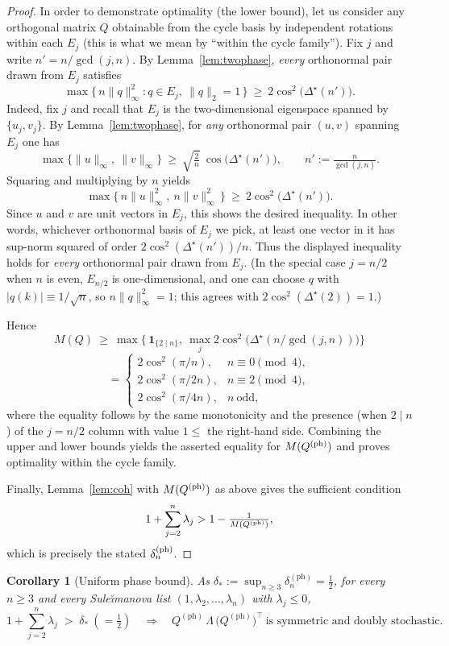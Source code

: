 \documentclass[12pt,fleqn]{amsart}
\renewcommand{\le}{\leqslant}
\renewcommand{\ge}{\geqslant}
\newtheorem{cor}[thm]{Corollary}
\theoremstyle{remark}
\newcommand{\1}{\mathbf{1}}
\begin{document}
\begin{proof}
In order to demonstrate optimality (the lower bound), let us consider any orthogonal matrix $Q$ obtainable from the cycle basis by independent rotations within each $E_j$ (this is what we mean by “within the cycle family”). Fix $j$ and write $n'=n/\gcd(j,n)$. By Lemma~\ref{lem:twophase}, \emph{every} orthonormal pair drawn from $E_j$ satisfies
\[
\max\{\,n\|q\|_\infty^2 : q\in E_j,\ \|q\|_2=1\,\}\ \ge\ 2\cos^2\!\big(\Delta^\star(n')\big).
\]
Indeed, fix $j$ and recall that $E_j$ is the two-dimensional eigenspace
spanned by $\{u_j,v_j\}$. By Lemma~\ref{lem:twophase}, for \emph{any}
orthonormal pair $(u,v)$ spanning $E_j$ one has
\[
\max\{\|u\|_\infty,\ \|v\|_\infty\}\ \ge\ 
\sqrt{\tfrac{2}{n}}\ \cos\!\bigl(\Delta^\star(n')\bigr),
\qquad n':=\tfrac{n}{\gcd(j,n)}.
\]
Squaring and multiplying by $n$ yields
\[
\max\{\,n\|u\|_\infty^2,\ n\|v\|_\infty^2\,\}\ \ge\
2\cos^2\!\bigl(\Delta^\star(n')\bigr).
\]
Since $u$ and $v$ are unit vectors in $E_j$, this shows the desired inequality. 
In other words, whichever orthonormal basis of $E_j$ we pick, at least
one vector in it has sup-norm squared of order $2\cos^2(\Delta^\star(n'))/n$.
Thus the displayed inequality holds for \emph{every} orthonormal pair
drawn from $E_j$. (In the special case $j=n/2$ when $n$ is even, $E_{n/2}$
is one-dimensional, and one can choose $q$ with $|q(k)|\equiv 1/\sqrt{n}$,
so $n\|q\|_\infty^2=1$; this agrees with
$2\cos^2(\Delta^\star(2))=1$.)

Hence
\[
M(Q)\ \ge\ \max\Big\{\,\mathbf{1}_{\{2\mid n\}},\ \max_{j}2\cos^2\!\big(\Delta^\star(n/\gcd(j,n))\big)\Big\}
\]
\[
=\begin{cases}
2\cos^2(\pi/n), & n\equiv 0\pmod 4,\\
2\cos^2(\pi/2n), & n\equiv 2\pmod 4,\\
2\cos^2(\pi/4n), & n\ \text{odd},
\end{cases}
\]
where the equality follows by the same monotonicity and the presence (when $2\mid n$) of the $j=n/2$ column with value $1\le$ the right-hand side. Combining the upper and lower bounds yields the asserted equality for $M(Q^{\rm (ph)})$ and proves optimality within the cycle family.

Finally, Lemma~\ref{lem:coh} with $M(Q^{\rm (ph)})$ as above gives the sufficient condition
\[
1+\sum_{j=2}^n\lambda_j>1-\tfrac{1}{M(Q^{\rm (ph)})},
\]
which is precisely the stated $\delta^{\rm (ph)}_n$.
\end{proof}

\begin{cor}[Uniform phase bound]\label{cor:uniform}
As $\delta_\ast:=\sup_{n\ge3}\delta^{\mathrm{(ph)}}_n=\tfrac12$, for every $n\ge3$ and every Sule\u{\i}manova list $(1,\lambda_2,\ldots,\lambda_n)$ with $\lambda_j\le0$,
\[
1+\sum_{j=2}^{n}\lambda_j \;>\; \delta_\ast\ (= \tfrac12)
\quad\Longrightarrow\quad
Q^{(\mathrm{ph})}\,\Lambda\,\big(Q^{(\mathrm{ph})}\big)^{\!\top}\ \text{is symmetric and doubly stochastic}.
\]
\end{cor}
\end{document}
